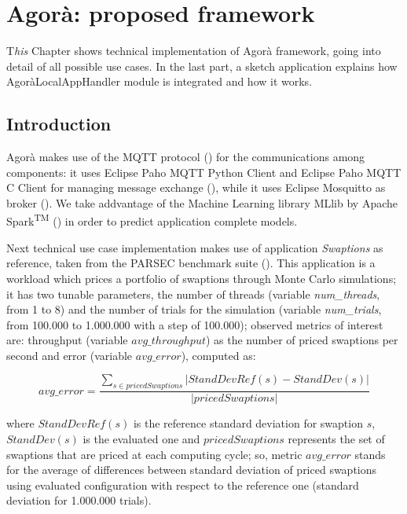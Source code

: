\chapter{Agorà: proposed framework}\label{agora}

\lettrine{T}{}\textit{his} Chapter shows technical implementation of Agorà framework, going into detail of all possible use cases. In the last part, a sketch application explains how AgoràLocalAppHandler module is integrated and how it works.


\section{Introduction}

Agorà makes use of the MQTT protocol (\cite{banks2014mqtt}) for the communications among components: it uses Eclipse Paho MQTT Python Client and Eclipse Paho MQTT C Client for managing message exchange (\cite{o2014paho}), while it uses Eclipse Mos\-quitto as broker (\cite{light2013mosquitto}). We take addvantage of the Machine Learning library MLlib by Apache Spark\textsuperscript{TM} (\cite{spark2015apache}) in order to predict application complete models.

Next technical use case implementation makes use of application \textit{Swaptions} as reference, taken from the PARSEC benchmark suite (\cite{bienia2008parsec}). This application is a workload which prices a portfolio of swaptions through Monte Carlo simulations; it has two tunable parameters, the number of threads (variable \textit{num\_threads}, from 1 to 8) and the number of trials for the simulation (variable \textit{num\_trials}, from 100.000 to 1.000.000 with a step of 100.000); observed metrics of interest are: throughput (variable $avg\_throughput$) as the number of priced swaptions per second and error (variable $avg\_error$), computed as:

\[
avg\_error = \dfrac{\sum_{s \in pricedSwaptions} \left\vert StandDevRef(s) - StandDev(s) \right\vert}{\left\vert pricedSwaptions \right\vert}
\]

where $StandDevRef(s)$ is the reference standard deviation for swaption $s$, $StandDev(s)$ is the evaluated one and $pricedSwaptions$ represents the set of swaptions that are priced at each computing cycle; so, metric $avg\_error$ stands for the average of differences between standard deviation of priced swaptions using evaluated configuration with respect to the reference one (standard deviation for 1.000.000 trials).

